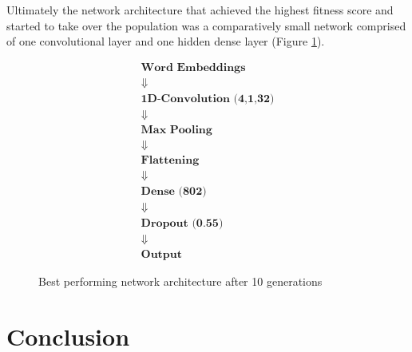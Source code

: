 \documentclass[11pt,a4paper,twoside,openright]{scrbook}
\begin{document}
\bigskip
Ultimately the network architecture that achieved the highest fitness score and started to take over the population was a comparatively small network comprised of one convolutional layer and one hidden dense layer (Figure \ref{finalarchitecture}).

\begin{figure}[H]
\begin{gather*}
   \boxed{\textbf{Word Embeddings}} \\[-0.7ex]
   \Downarrow \\[-0.7ex]
   \boxed{\textbf{1D-Convolution (4,1,32)}} \\[-0.7ex]
   \Downarrow \\[-0.7ex]
   \boxed{\textbf{Max Pooling}} \\[-0.7ex]
   \Downarrow \\[-0.7ex]
   \boxed{\textbf{Flattening}} \\[-0.7ex]
   \Downarrow \\[-0.7ex]
   \boxed{\textbf{Dense (802)}} \\[-0.7ex]
   \Downarrow \\[-0.7ex]
   \boxed{\textbf{Dropout (0.55)}} \\[-0.7ex]
   \Downarrow \\[-0.7ex]
   \boxed{\textbf{Output}}
\end{gather*}
\caption{Best performing network architecture after 10 generations}
\label{finalarchitecture}
\end{figure}



\chapter{Conclusion}
\end{document}
